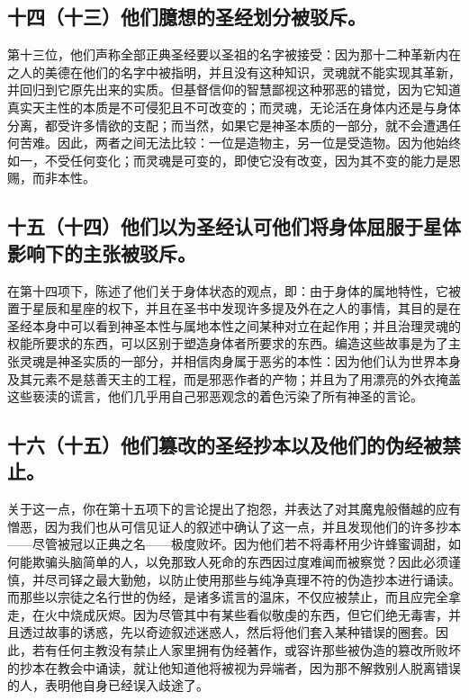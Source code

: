 
\subsection{十四（十三）他们臆想的圣经划分被驳斥。}

第十三位，他们声称全部正典圣经要以圣祖的名字被接受：因为那十二种革新内在之人的美德在他们的名字中被指明，并且没有这种知识，灵魂就不能实现其革新，并回归到它原先出来的实质。但基督信仰的智慧鄙视这种邪恶的错觉，因为它知道真实天主性的本质是不可侵犯且不可改变的；而灵魂，无论活在身体内还是与身体分离，都受许多情欲的支配；而当然，如果它是神圣本质的一部分，就不会遭遇任何苦难。因此，两者之间无法比较：一位是造物主，另一位是受造物。因为他始终如一，不受任何变化；而灵魂是可变的，即使它没有改变，因为其不变的能力是恩赐，而非本性。\par


\subsection{十五（十四）他们以为圣经认可他们将身体屈服于星体影响下的主张被驳斥。}

在第十四项下，陈述了他们关于身体状态的观点，即：由于身体的属地特性，它被置于星辰和星座的权下，并且在圣书中发现许多提及外在之人的事情，其目的是在圣经本身中可以看到神圣本性与属地本性之间某种对立在起作用；并且治理灵魂的权能所要求的东西，可以区别于塑造身体者所要求的东西。编造这些故事是为了主张灵魂是神圣实质的一部分，并相信肉身属于恶劣的本性：因为他们认为世界本身及其元素不是慈善天主的工程，而是邪恶作者的产物；并且为了用漂亮的外衣掩盖这些亵渎的谎言，他们几乎用自己邪恶观念的着色污染了所有神圣的言论。\par


\subsection{十六（十五）他们篡改的圣经抄本以及他们的伪经被禁止。}

关于这一点，你在第十五项下的言论提出了抱怨，并表达了对其魔鬼般僭越的应有憎恶，因为我们也从可信见证人的叙述中确认了这一点，并且发现他们的许多抄本——尽管被冠以正典之名——极度败坏。因为他们若不将毒杯用少许蜂蜜调甜，如何能欺骗头脑简单的人，以免那致人死命的东西因过度难闻而被察觉？因此必须谨慎，并尽司铎之最大勤勉，以防止使用那些与纯净真理不符的伪造抄本进行诵读。而那些以宗徒之名行世的伪经，是诸多谎言的温床，不仅应被禁止，而且应完全拿走，在火中烧成灰烬。因为尽管其中有某些看似敬虔的东西，但它们绝无毒害，并且透过故事的诱惑，先以奇迹叙述迷惑人，然后将他们套入某种错误的圈套。因此，若有任何主教没有禁止人家里拥有伪经著作，或容许那些被伪造的篡改所败坏的抄本在教会中诵读，就让他知道他将被视为异端者，因为那不解救别人脱离错误的人，表明他自身已经误入歧途了。\par


